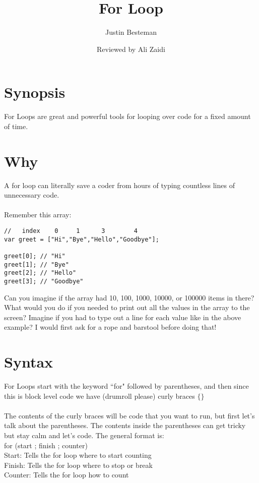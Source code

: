 \documentclass[12pt, letterpaper]{article}
\title{For Loop }
\author{Justin Besteman}
\date{Reviewed by Ali Zaidi}
\begin{document}
\maketitle


\section*{Synopsis}

For Loops are great and powerful tools for looping over code for a fixed amount of time.\\

\section*{Why}

A for loop can literally save a coder from hours of typing countless lines of unnecessary code. \\ \\
Remember this array:

\begin{lstlisting}
//   index    0     1      3        4
var greet = ["Hi","Bye","Hello","Goodbye"];

greet[0]; // "Hi"
greet[1]; // "Bye"
greet[2]; // "Hello"
greet[3]; // "Goodbye"
\end{lstlisting}
Can you imagine if the array had 10, 100, 1000, 10000, or 100000 items in there? What would you do if you needed to print out all the values in the array to the screen? Imagine if you had to type out a line for each value like in the above example? I would first ask for a rope and barstool before doing that!\\
\section*{Syntax}

For Loops start with the keyword ``for" followed by parentheses, and then since this is block level code we have (drumroll please) curly braces $\lbrace\rbrace$ \\ \\
The contents of the curly braces will be code that you want to run, but first let's talk about the parentheses. The contents inside the parentheses can get tricky but stay calm and let's code. The general format is: \\
for (start ; finish ; counter) \\
Start: Tells the for loop where to start counting\\
Finish: Tells the for loop where to stop or break\\
Counter: Tells the for loop how to count\\ \\
\end{document}
